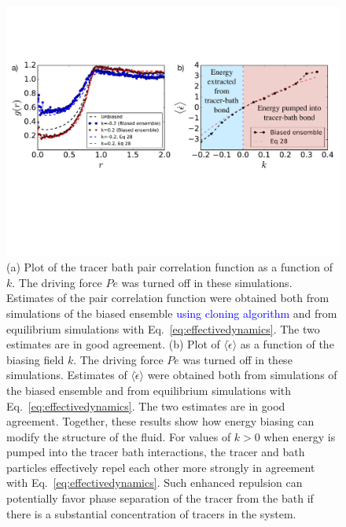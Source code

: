 \documentclass[pre, superscriptaddress, twocolumn,pre]{revtex4-1}
\begin{document}
\begin{figure}
	\centering
	\includegraphics[width=0.99\linewidth]{Fig4Full.pdf}
	\caption{\label{fig:energybias}
		(a) Plot of the tracer bath pair correlation function as a function of $k$. The driving force $Pe$ was turned off in these simulations. Estimates of the pair correlation function were obtained both from simulations of the biased ensemble \textcolor{blue}{using cloning algorithm} and from equilibrium simulations with Eq.~\ref{eq:effectivedynamics}. The two estimates are in good agreement. 
		(b) Plot of $\langle\dot{\epsilon}\rangle$ as a function of the biasing field $k$. The driving force $Pe$ was turned off in these simulations.  Estimates of $\langle\dot{\epsilon}\rangle$ were obtained both from simulations of the biased ensemble and from equilibrium simulations with Eq.~\ref{eq:effectivedynamics}. The two estimates are in good agreement. Together, these results show how energy biasing can modify the structure of the fluid. For values of $k>0$ when energy is pumped into the tracer bath interactions, the tracer and bath particles effectively repel each other more strongly in agreement with Eq.~\ref{eq:effectivedynamics}. Such enhanced repulsion can potentially favor phase separation of the tracer from the bath if there is a substantial concentration of tracers in the system.}
\end{figure}
\end{document}
